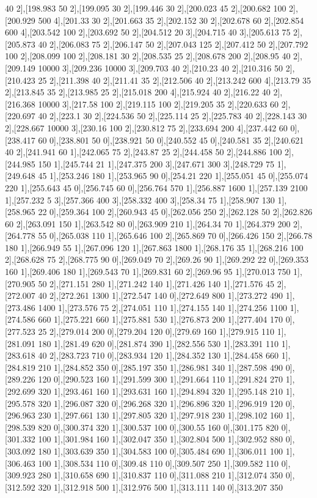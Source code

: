 {40 2],[198.983 50 2],[199.095 30 2],[199.446 30 2],[200.023 45 2],[200.682 100 2],[200.929 500 4],[201.33 30 2],[201.663 35 2],[202.152 30 2],[202.678 60 2],[202.854 600 4],[203.542 100 2],[203.692 50 2],[204.512 20 3],[204.715 40 3],[205.613 75 2],[205.873 40 2],[206.083 75 2],[206.147 50 2],[207.043 125 2],[207.412 50 2],[207.792 100 2],[208.099 100 2],[208.181 30 2],[208.535 25 2],[208.678 200 2],[208.95 40 2],[209.149 10000 3],[209.236 10000 3],[209.703 40 2],[210.23 40 2],[210.316 50 2],[210.423 25 2],[211.398 40 2],[211.41 35 2],[212.506 40 2],[213.242 600 4],[213.79 35 2],[213.845 35 2],[213.985 25 2],[215.018 200 4],[215.924 40 2],[216.22 40 2],[216.368 10000 3],[217.58 100 2],[219.115 100 2],[219.205 35 2],[220.633 60 2],[220.697 40 2],[223.1 30 2],[224.536 50 2],[225.114 25 2],[225.783 40 2],[228.143 30 2],[228.667 10000 3],[230.16 100 2],[230.812 75 2],[233.694 200 4],[237.442 60 0],[238.417 60 0],[238.801 50 0],[238.921 50 0],[240.552 45 0],[240.581 35 2],[240.621 40 2],[241.941 60 1],[242.065 75 2],[243.87 25 2],[244.458 50 2],[244.886 100 2],[244.985 150 1],[245.744 21 1],[247.375 200 3],[247.671 300 3],[248.729 75 1],[249.648 45 1],[253.246 180 1],[253.965 90 0],[254.21 220 1],[255.051 45 0],[255.074 220 1],[255.643 45 0],[256.745 60 0],[256.764 570 1],[256.887 1600 1],[257.139 2100 1],[257.232 5 3],[257.366 400 3],[258.332 400 3],[258.34 75 1],[258.907 130 1],[258.965 22 0],[259.364 100 2],[260.943 45 0],[262.056 250 2],[262.128 50 2],[262.826 60 2],[263.091 150 1],[263.542 80 0],[263.909 210 1],[264.34 70 1],[264.379 200 2],[264.778 55 0],[265.038 110 1],[265.646 100 2],[265.869 70 0],[266.426 150 2],[266.78 180 1],[266.949 55 1],[267.096 120 1],[267.863 1800 1],[268.176 35 1],[268.216 100 2],[268.628 75 2],[268.775 90 0],[269.049 70 2],[269.26 90 1],[269.292 22 0],[269.353 160 1],[269.406 180 1],[269.543 70 1],[269.831 60 2],[269.96 95 1],[270.013 750 1],[270.905 50 2],[271.151 280 1],[271.242 140 1],[271.426 140 1],[271.576 45 2],[272.007 40 2],[272.261 1300 1],[272.547 140 0],[272.649 800 1],[273.272 490 1],[273.486 1400 1],[273.576 75 2],[274.051 110 1],[274.155 140 1],[274.256 1100 1],[274.586 660 1],[275.221 660 1],[275.881 530 1],[276.873 200 1],[277.404 170 0],[277.523 25 2],[279.014 200 0],[279.204 120 0],[279.69 160 1],[279.915 110 1],[281.091 180 1],[281.49 620 0],[281.874 390 1],[282.556 530 1],[283.391 110 1],[283.618 40 2],[283.723 710 0],[283.934 120 1],[284.352 130 1],[284.458 660 1],[284.819 210 1],[284.852 350 0],[285.197 350 1],[286.981 340 1],[287.598 490 0],[289.226 120 0],[290.523 160 1],[291.599 300 1],[291.664 110 1],[291.824 270 1],[292.699 320 1],[293.461 160 1],[293.631 160 1],[294.894 320 1],[295.148 210 1],[295.578 320 1],[296.087 320 0],[296.268 320 1],[296.896 320 1],[296.919 120 0],[296.963 230 1],[297.661 130 1],[297.805 320 1],[297.918 230 1],[298.102 160 1],[298.539 820 0],[300.374 320 1],[300.537 100 0],[300.55 160 0],[301.175 820 0],[301.332 100 1],[301.984 160 1],[302.047 350 1],[302.804 500 1],[302.952 880 0],[303.092 180 1],[303.639 350 1],[304.583 100 0],[305.484 690 1],[306.011 100 1],[306.463 100 1],[308.534 110 0],[309.48 110 0],[309.507 250 1],[309.582 110 0],[309.923 280 1],[310.658 690 1],[310.837 110 0],[311.088 210 1],[312.074 350 0],[312.592 320 1],[312.918 500 1],[312.976 500 1],[313.111 140 0],[313.207 350 }
